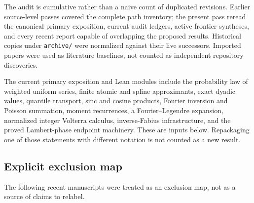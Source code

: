 \documentclass[11pt]{article}
\theoremstyle{definition}
\theoremstyle{remark}
\begin{document}
The audit is cumulative rather than a naive count of duplicated revisions.
Earlier source-level passes covered the complete path inventory; the present
pass reread the canonical primary exposition, current audit ledgers, active
frontier syntheses, and every recent report capable of overlapping the proposed
results.  Historical copies under \texttt{archive/} were normalized against
their live successors.  Imported papers were used as literature baselines, not
counted as independent repository discoveries.

\begin{statusbox}
The current primary exposition and Lean modules include the probability law of
weighted uniform series, finite atomic and spline approximants, exact dyadic
values, quantile transport, sinc and cosine products, Fourier inversion and
Poisson summation, moment recurrences, a Fourier--Legendre expansion, normalized
integer Volterra calculus, inverse-Fabius infrastructure, and the proved
Lambert-phase endpoint machinery.  These are inputs below.  Repackaging one of
those statements with different notation is not counted as a new result.
\end{statusbox}

\subsection{Explicit exclusion map}

The following recent manuscripts were treated as an exclusion map, not as a
source of claims to relabel.
\end{document}
